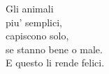 


\begin{haiku}
    Gli animali\\
    piu' semplici,\\
    capiscono solo,\\
    se stanno bene o male.\\
    E questo li rende felici.\\
\end{haiku}

